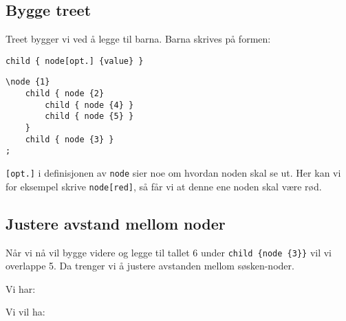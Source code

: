 \documentclass[11pt, a4paper]{article}
\begin{document}
\subsection{Bygge treet}
Treet bygger vi ved å legge til barna. Barna skrives på formen:
\begin{Verbatim}[fontsize=\small]
child { node[opt.] {value} }
\end{Verbatim}

\begin{center}
\end{center}

\begin{Verbatim}[fontsize=\small, frame=single]
\node {1}
    child { node {2} 
        child { node {4} }
        child { node {5} }
    }
    child { node {3} }
;
\end{Verbatim}
\texttt{[opt.]} i definisjonen av \texttt{node} sier noe om hvordan noden skal se ut. Her kan vi for eksempel skrive \texttt{node[red]}, så får vi at denne ene noden skal være rød. 

\newpage

\subsection{Justere avstand mellom noder}

Når vi nå vil bygge videre og legge til tallet 6 under \texttt{child \{node \{3\}\}} vil vi overlappe 5. Da trenger vi å justere avstanden mellom søsken-noder.

\vspace{20pt}

\begin{minipage}{0.5\textwidth}
Vi har: \newline \newline
{}
\end{minipage}
\begin{minipage}{0.5\textwidth}
Vi vil ha: \newline \newline
{}
\end{minipage}
\end{document}
